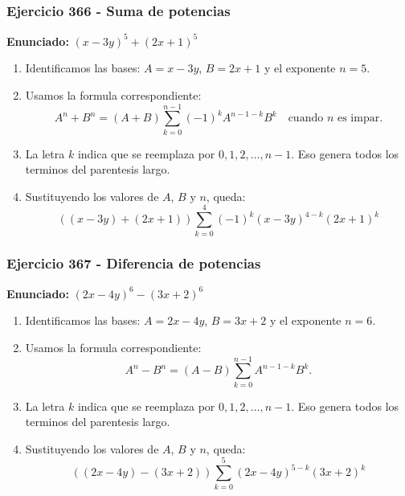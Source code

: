\documentclass[11pt,a4paper]{article}
\begin{document}
\subsubsection*{Ejercicio 366 - Suma de potencias}
\textbf{Enunciado:} $ \left(x - 3 y\right)^{5}+\left(2 x + 1\right)^{5} $\par
\begin{enumerate}[leftmargin=2em]
\item Identificamos las bases: \(A=x - 3 y\), \(B=2 x + 1\) y el exponente \(n=5\).
\item Usamos la formula correspondiente: \[A^n+B^n=(A+B)\sum_{k=0}^{n-1}(-1)^kA^{n-1-k}B^k\quad\text{cuando }n\text{ es impar}.\]
\item La letra \(k\) indica que se reemplaza por \(0,1,2,\ldots,n-1\). Eso genera todos los terminos del parentesis largo.
\item Sustituyendo los valores de \(A\), \(B\) y \(n\), queda: \[\boxed{\left(\left(x - 3 y\right)+\left(2 x + 1\right)\right)\sum_{k=0}^{4}(-1)^k\left(x - 3 y\right)^{4-k}\left(2 x + 1\right)^k}\]
\end{enumerate}

\vspace{0.2cm}
\subsubsection*{Ejercicio 367 - Diferencia de potencias}
\textbf{Enunciado:} $ \left(2 x - 4 y\right)^{6}-\left(3 x + 2\right)^{6} $\par
\begin{enumerate}[leftmargin=2em]
\item Identificamos las bases: \(A=2 x - 4 y\), \(B=3 x + 2\) y el exponente \(n=6\).
\item Usamos la formula correspondiente: \[A^n-B^n=(A-B)\sum_{k=0}^{n-1}A^{n-1-k}B^k.\]
\item La letra \(k\) indica que se reemplaza por \(0,1,2,\ldots,n-1\). Eso genera todos los terminos del parentesis largo.
\item Sustituyendo los valores de \(A\), \(B\) y \(n\), queda: \[\boxed{\left(\left(2 x - 4 y\right)-\left(3 x + 2\right)\right)\sum_{k=0}^{5}\left(2 x - 4 y\right)^{5-k}\left(3 x + 2\right)^k}\]
\end{enumerate}

\vspace{0.2cm}
\end{document}
